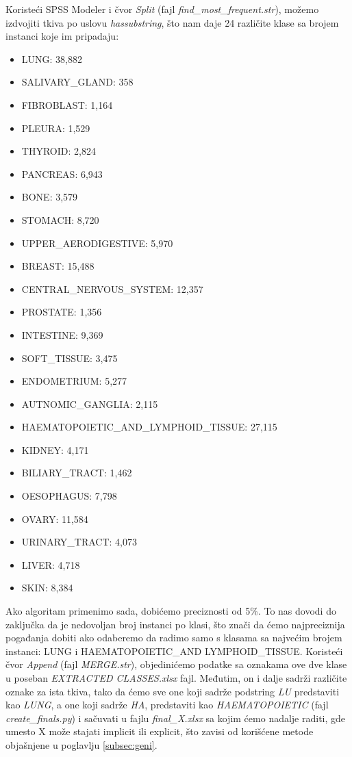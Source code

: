 \documentclass[a4paper]{article}
\begin{document}
Koristeći SPSS Modeler i čvor \textit{Split} (fajl \textit{find\_most\_frequent.str}), možemo izdvojiti tkiva po uslovu \textit{hassubstring}, što nam daje 24 različite klase sa brojem instanci koje im pripadaju:
\begin{itemize}
    \item LUNG: 38,882
    \item SALIVARY\_GLAND: 358
    \item FIBROBLAST: 1,164
    \item PLEURA: 1,529
    \item THYROID: 2,824
    \item PANCREAS: 6,943
    \item BONE: 3,579
    \item STOMACH: 8,720
    \item UPPER\_AERODIGESTIVE: 5,970
    \item BREAST: 15,488
    \item CENTRAL\_NERVOUS\_SYSTEM: 12,357
    \item PROSTATE: 1,356
    \item INTESTINE: 9,369
    \item SOFT\_TISSUE: 3,475
    \item ENDOMETRIUM: 5,277
    \item AUTNOMIC\_GANGLIA: 2,115
    \item HAEMATOPOIETIC\_AND\_LYMPHOID\_TISSUE: 27,115
    \item KIDNEY: 4,171
    \item BILIARY\_TRACT: 1,462
    \item OESOPHAGUS: 7,798
    \item OVARY: 11,584
    \item URINARY\_TRACT: 4,073
    \item LIVER: 4,718
    \item SKIN: 8,384
\end{itemize}

Ako algoritam primenimo sada, dobićemo preciznosti od 5\%. To nas dovodi do zaključka da je nedovoljan broj instanci po klasi, što znači da ćemo najpreciznija pogađanja dobiti ako odaberemo da radimo samo s klasama sa najvećim brojem instanci: LUNG i HAEMATOPOIETIC\_AND LYMPHOID\_TISSUE. Koristeći čvor \textit{Append} (fajl \textit{MERGE.str}), objedinićemo podatke sa oznakama ove dve klase u poseban \textit{EXTRACTED CLASSES.xlsx} fajl. Međutim, on i dalje sadrži različite oznake za ista tkiva, tako da ćemo sve one koji sadrže podstring \textit{LU} predstaviti kao \textit{LUNG}, a one koji sadrže \textit{HA}, predstaviti kao \textit{HAEMATOPOIETIC} (fajl \textit{create\_finals.py}) i sačuvati u fajlu \textit{final\_X.xlsx} sa kojim ćemo nadalje raditi, gde umesto X može stajati implicit ili explicit, što zavisi od korišćene metode objašnjene u poglavlju \ref{subsec:geni}.
\end{document}
